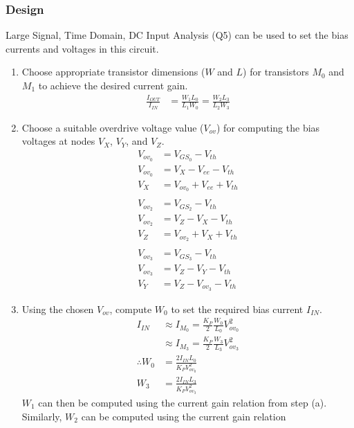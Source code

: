 \subsubsection{Design}
Large Signal, Time Domain, DC Input Analysis (Q5) can be used to set the bias
currents and voltages in this circuit.
\begin{enumerate}
  \item Choose appropriate transistor dimensions
    ($W$ and $L$) for transistors $M_0$ and $M_1$
    to achieve the desired current gain.
    \begin{align*}
      \frac{I_{OUT}}{I_{IN}} &= \frac{W_1 L_0}{L_1 W_0} = \frac{W_2 L_3}{L_2 W_3}
    \end{align*}
  \item Choose a suitable overdrive voltage value
    ($V_{ov}$) for computing the bias voltages at
    nodes $V_{X}$, $V_{Y}$, and $V_{Z}$.
    \begin{align*}
      V_{ov_0} &= V_{GS_0} - V_{th} \\
      V_{ov_0} &= V_{X} - V_{ee} - V_{th} \\
      V_{X} &= V_{ov_0} + V_{ee} + V_{th} \\
      \\
      V_{ov_2} &= V_{GS_2} - V_{th} \\
      V_{ov_2} &= V_{Z} - V_{X} - V_{th} \\
      V_{Z} &= V_{ov_2} + V_{X} + V_{th} \\
      \\
      V_{ov_3} &= V_{GS_3} - V_{th} \\
      V_{ov_3} &= V_{Z} - V_{Y} - V_{th} \\
      V_{Y} &= V_{Z} - V_{ov_3} - V_{th}
    \end{align*}
  \item Using the chosen $V_{ov}$, compute $W_0$
    to set the required bias current $I_{IN}$.
    \begin{align*}
      I_{IN} &\approx I_{M_0} = \frac{K_P}{2} \frac{W_0}{L_0} V_{ov_0}^2 \\
             &\approx I_{M_3} = \frac{K_P}{2} \frac{W_3}{L_3} V_{ov_3}^2 \\
      \therefore W_0 &= \frac{2 I_{IN} L_0}{K_P V_{ov_0}^2} \\
                 W_3 &= \frac{2 I_{IN} L_3}{K_P V_{ov_3}^2}
    \end{align*}
    $W_1$ can then be computed using the current
    gain relation from step (a). Similarly, $W_2$
    can be computed using the current gain relation

\end{enumerate}
